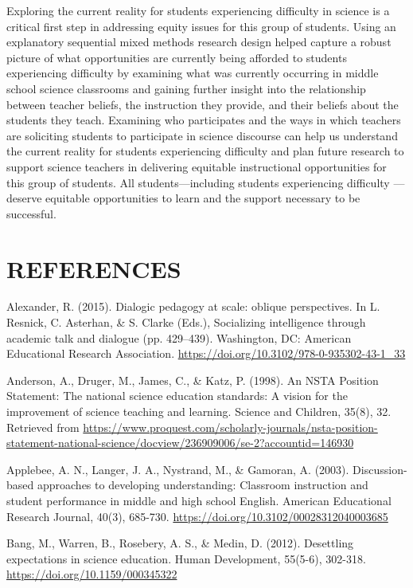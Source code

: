 \documentclass{sig-alternate} %
\begin{document}
\begin{large}
Exploring the current reality for students experiencing difficulty in science is a critical first step in addressing equity issues for this group of students. Using an explanatory sequential mixed methods research design helped capture a robust picture of what opportunities are currently being afforded to students experiencing difficulty by examining what was currently occurring in middle school science classrooms and gaining further insight into the relationship between teacher beliefs, the instruction they provide, and their beliefs about the students they teach. Examining who participates and the ways in which teachers are soliciting students to participate in science discourse can help us understand the current reality for students experiencing difficulty and plan future research to support science teachers in delivering equitable instructional opportunities for this group of students. All students—including students experiencing difficulty —deserve equitable opportunities to learn and the support necessary to be successful.


\end{large}
\clearpage
\section*{REFERENCES}\par 
\leftskip 0.25in
\parindent -0.25in

Alexander, R. (2015). Dialogic pedagogy at scale: oblique perspectives. In L. Resnick, C. Asterhan, \& S. Clarke (Eds.), Socializing intelligence through academic talk and dialogue (pp. 429–439). Washington, DC: American Educational Research Association. \url{https://doi.org/10.3102/978-0-935302-43-1_33}

Anderson, A., Druger, M., James, C., \& Katz, P. (1998). An NSTA Position Statement: The national science education standards: A vision for the improvement of science teaching and learning. Science and Children, 35(8), 32. Retrieved from \url{https://www.proquest.com/scholarly-journals/nsta-position-statement-national-science/docview/236909006/se-2?accountid=146930}

Applebee, A. N., Langer, J. A., Nystrand, M., \& Gamoran, A. (2003). Discussion-based approaches to developing understanding: Classroom instruction and student performance in middle and high school English. American Educational Research Journal, 40(3), 685-730. \url{https://doi.org/10.3102/00028312040003685}

Bang, M., Warren, B., Rosebery, A. S., \& Medin, D. (2012). Desettling expectations in science education. Human Development, 55(5-6), 302-318. \url{https://doi.org/10.1159/000345322}
\end{document}
